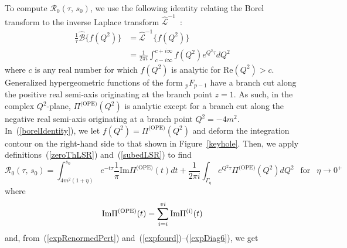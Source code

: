 \documentclass[11pt, letterpaper]{article}
\newcommand{\lsr}{\mathcal{R}_{0}}
\newcommand{\hypgeom}[2]{{}_{#1}F_{#2}}
\newcommand{\double}[2]{(#1,\,#2)}
\newcommand{\dif}[1]{d #1}
\newcommand{\rom}[1]{\uppercase\expandafter{\romannumeral #1\relax}}
\begin{document}
To compute $\lsr\double{\tau}{s_0}$,
we use the following identity relating the Borel transform 
to the inverse Laplace transform $\hat{\mathcal{L}}^{-1}$~\cite{Shifman:1978bx}:
%
\begin{equation}\label{borelIdentity}
\begin{aligned}
  \frac{1}{\tau}\hat{\mathcal{B}} \Big\{ f(Q^2) \Big\}&=\hat{\mathcal{L}}^{-1} \Big\{ f(Q^2) \Big\}\\
  &= \frac{1}{2 \pi i} \int_{c-i \infty}^{c+i \infty} f(Q^2) e^{Q^2 \tau} \dif{Q^2}
\end{aligned}
\end{equation}
%
where $c$ is any real number for which $f(Q^2)$ is analytic for 
$\text{Re}(Q^2)>c$. 
Generalized hypergeometric functions of the form $\hypgeom{p}{p-1}$ have a branch cut along
the positive real semi-axis originating at the branch point $z=1$.
As such, in the complex $Q^2$-plane, $\Pi^{\text{(OPE)}}(Q^2)$ is analytic except 
for a branch cut along the negative real semi-axis originating at a branch 
point $Q^2=-4m^2$.
In~(\ref{borelIdentity}), we let $f(Q^2)=\Pi^{\text{(OPE)}}(Q^2)$
and deform the integration contour on the right-hand side to that shown in
Figure~\ref{keyhole}.  
Then, we apply definitions~(\ref{zeroThLSR}) and~(\ref{subedLSR}) 
to find
%
\begin{equation}\label{intermediateTheoryLSR}
  \lsr\double{\tau}{s_0}=\int_{4m^2(1+\eta)}^{s_0}e^{-t\tau}\frac{1}{\pi}
    \text{Im}\Pi^{\text{(OPE)}}(t)\dif{t}
  +\frac{1}{2\pi i}\int_{\Gamma_{\eta}} e^{Q^2 \tau}
    \Pi^{\text{(OPE)}}(Q^2) \dif{Q^2}\ \;\; \text{for}\ \;\; \eta\rightarrow0^{+}
\end{equation}
%
where
%
\begin{equation}\label{breakdown}
  \text{Im}\Pi^{\text{(OPE)}}(t)=
  \sum_{i=\rom{1}}^{\rom{6}}\text{Im}\Pi^{\text{(i)}}(t)
\end{equation}
%
and, from~(\ref{expRenormedPert}) and~(\ref{expfourd})--(\ref{expDiag6}), we get
%
\end{document}
